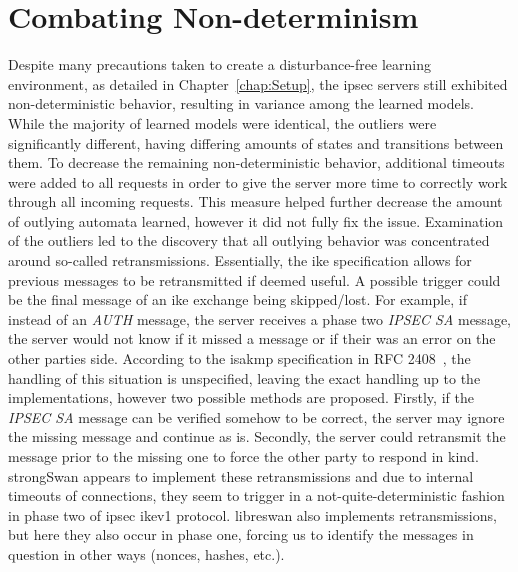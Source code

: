 \section{Combating Non-determinism} \label{sec:nondet}
Despite many precautions taken to create a disturbance-free learning environment, as detailed in Chapter~\ref{chap:Setup}, the \ac{ipsec} servers still exhibited non-deterministic behavior, resulting in variance among the learned models. While the majority of learned models were identical, the outliers were significantly different, having differing amounts of states and transitions between them. To decrease the remaining non-deterministic behavior, additional timeouts were added to all requests in order to give the server more time to correctly work through all incoming requests. This measure helped further decrease the amount of outlying automata learned, however it did not fully fix the issue. Examination of the outliers led to the discovery that all outlying behavior was concentrated around so-called retransmissions. Essentially, the \ac{ike} specification allows for previous messages to be retransmitted if deemed useful. A possible trigger could be the final message of an \ac{ike} exchange being skipped/lost. For example, if instead of an \emph{AUTH} message, the server receives a phase two \emph{IPSEC SA} message, the server would not know if it missed a message or if their was an error on the other parties side. According to the \ac{isakmp} specification in RFC 2408~\cite{rfc:isakmp}, the handling of this situation is unspecified, leaving the exact handling up to the implementations, however two possible methods are proposed. Firstly, if the \emph{IPSEC SA} message can be verified somehow to be correct, the server may ignore the missing message and continue as is. Secondly, the server could retransmit the message prior to the missing one to force the other party to respond in kind. strongSwan appears to implement these retransmissions and due to internal timeouts of connections, they seem to trigger in a not-quite-deterministic fashion in phase two of \ac{ipsec} \ac{ike}v1 protocol. libreswan also implements retransmissions, but here they also occur in phase one, forcing us to identify the messages in question in other ways (nonces, hashes, etc.).

